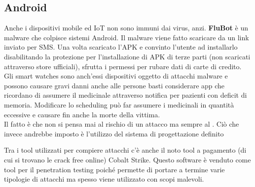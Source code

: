 \subsection{Android}
Anche i dispositivi mobile ed \acrfull{IoT} non sono immuni dai virus, anzi.
\textbf{FluBot} è un malware che colpisce sistemi Android.
Il malware viene fatto scaricare da un link inviato per SMS. Una volta scaricato l'\acrshort{APK} e convinto l'utente ad installarlo disabilitando la protezione per l'installazione di APK di terze parti (non scaricati attraverso store ufficiali), sfrutta i permessi per rubare dati di carte di credito.\\
Gli smart watches sono anch'essi dispositivi oggetto di attacchi malware e possono causare gravi danni anche alle persone basti considerare app che ricordano di assumere il medicinale attraverso notifica per pazienti con deficit di memoria.
Modificare lo scheduling può far assumere i medicinali in quantità eccessive e causare fin anche la morte della vittima.\\
Il fatto è che non si pensa mai al rischio di un attacco ma sempre al .
Ciò che invece andrebbe imposto è l'utilizzo del sistema di progettazione definito 

Tra i tool utilizzati per compiere attacchi c'è anche il noto tool a pagamento (di cui si trovano le crack free online) Cobalt Strike. Questo software è venduto come tool per il penetration testing poiché permette di portare a termine varie tipologie di attacchi ma spesso viene utilizzato con scopi malevoli.

